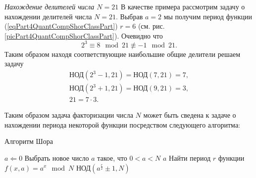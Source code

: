 \begin{example}
\emph{Нахождение делителей числа $N=21$}
\label{exPart4QuantCompShorGCD}
В качестве примера рассмотрим задачу о нахождении делителей числа $N =
21$. Выбрав $a=2$ мы получим период функции
(\ref{eqPart4QuantCompShorClassPart}) $r = 6$ (см. рис.
\ref{picPart4QuantCompShorClassPart}). 
Очевидно что 
\[
2^3 \equiv 8 \mod{21} \not\equiv -1 \mod{21}.
\]
Таким образом находя соответствующие наибольшие общие делители решаем
задачу
\begin{eqnarray}
\mbox{НОД}\left( 2^3 - 1, 21 \right) = \mbox{НОД}\left( 7, 21 \right)
= 7,
\nonumber \\
\mbox{НОД}\left( 2^3 + 1, 21 \right) = \mbox{НОД}\left( 9, 21 \right)
= 3,
\nonumber \\
21 = 7 \cdot 3.
\nonumber
\end{eqnarray}
\end{example}

Таким образом задача факторизации числа $N$ может быть сведена к
задаче о нахождении периода некоторой функции посредством следующего
алгоритма:
\begin{algorithm}
\caption{Алгоритм Шора}
\begin{algorithmic}
    \STATE $a \Leftarrow 0$
    \REPEAT
        \STATE Выбрать новое число $a$ такое, что $0 < a < N$
            \RETURN $a$
        \ENDIF
        \STATE Найти период $r$ функции $f\left(x, a\right) = a^x \mod{N}$
    \RETURN $\mbox{НОД}\left(a^{\frac{r}{2}} \pm 1, N\right)$
\end{algorithmic}
\end{algorithm}






